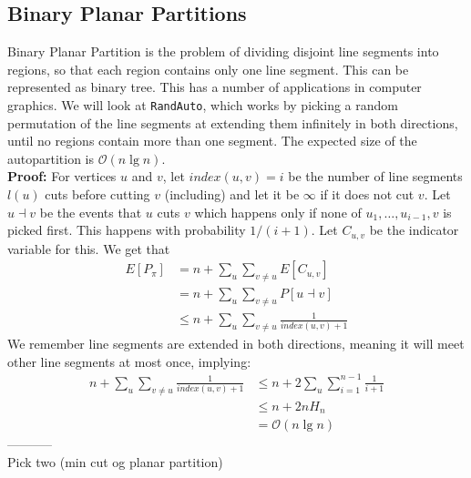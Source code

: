 \documentclass[a4paper, fleqn]{article}
\begin{document}
\subsection*{Binary Planar Partitions}
Binary Planar Partition is the problem of dividing disjoint line segments into regions, so that each region contains only one line segment. This can be represented as binary tree. This has a number of applications in computer graphics. We will look at \texttt{RandAuto}, which works by picking a random permutation of the line segments at extending them infinitely in both directions, until no regions contain more than one segment. The expected size of the autopartition is $\mathcal{O}(n\lg n)$. \\
\textbf{Proof:} For vertices $u$ and $v$, let $index(u,v)=i$ be the number of line segments $l(u)$ cuts before cutting $v$ (including) and let it be $\infty$ if it does not cut $v$. Let $u\dashv v$ be the events that $u$ cuts $v$ which happens only if none of $u_1,\ldots, u_{i-1}, v$ is picked first. This happens with probability $1/(i+1)$. Let $C_{u,v}$ be the indicator variable for this. We get that
\begin{align*}
  E[P_\pi] &= n + \sum_u \sum_{v\neq u} E[C_{u,v}] \\
                                             &=  n + \sum_u \sum_{v\neq u} P[u\dashv v] \\
                                             &\leq n+ \sum_u \sum_{v\neq u} \frac{1}{index(u,v)+1}
\end{align*}
We remember line segments are extended in both directions, meaning it will meet other line segments at most once, implying:
\begin{align*}
  n + \sum_u \sum_{v\neq u} \frac{1}{index(u,v)+1} &\leq  n + 2\sum_u \sum_{i=1}^{n-1} \frac{1}{i+1} \\
                                                   &\leq n+ 2nH_n \\
                                                   &= \mathcal{O}(n\lg n)
\end{align*}
$ $ \\
----------- \\
Pick two (min cut og planar partition)
\end{document}

